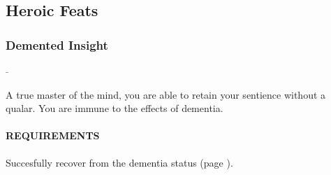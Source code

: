 \subsection*{Heroic Feats}
\subsubsection{Demented Insight} \label{feat::dementedinsight}
\small{\textcolor{gray}{-}}

\normalsize
A true master of the mind, you are able to retain your sentience without a qualar.
You are immune to the effects of dementia.
\paragraph{REQUIREMENTS} Succesfully recover from the dementia status (page \pageref{ssec::dementia}).
